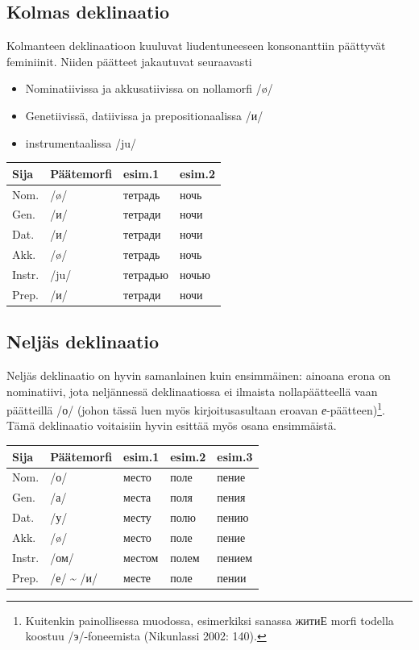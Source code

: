\documentclass[]{scrreprt}
\providecommand{\tightlist}{%
  \setlength{\itemsep}{0pt}\setlength{\parskip}{0pt}}
\begin{document}
\subsection{Kolmas deklinaatio}\label{kolmas-deklinaatio}

Kolmanteen deklinaatioon kuuluvat liudentuneeseen konsonanttiin
päättyvät feminiinit. Niiden päätteet jakautuvat seuraavasti

\begin{itemize}
\tightlist
\item
  Nominatiivissa ja akkusatiivissa on nollamorfi /ø/
\item
  Genetiivissä, datiivissa ja prepositionaalissa /и/
\item
  instrumentaalissa /ju/
\end{itemize}

\begin{longtable}[c]{@{}llll@{}}
\toprule
Sija & Päätemorfi & esim.1 & esim.2\tabularnewline
\midrule
\endhead
Nom. & /ø/ & тетрадь & ночь\tabularnewline
Gen. & /и/ & тетради & ночи\tabularnewline
Dat. & /и/ & тетради & ночи\tabularnewline
Akk. & /ø/ & тетрадь & ночь\tabularnewline
Instr. & /ju/ & тетрадью & ночью\tabularnewline
Prep. & /и/ & тетради & ночи\tabularnewline
\bottomrule
\end{longtable}

\subsection{Neljäs deklinaatio}\label{neljuxe4s-deklinaatio}

Neljäs deklinaatio on hyvin samanlainen kuin ensimmäinen: ainoana erona
on nominatiivi, jota neljännessä deklinaatiossa ei ilmaista
nollapäätteellä vaan päätteillä /о/ (johon tässä luen myös
kirjoitusasultaan eroavan \emph{е}-päätteen)\footnote{Kuitenkin
  painollisessa muodossa, esimerkiksi sanassa житиЕ morfi todella
  koostuu /э/-foneemista (Nikunlassi 2002: 140).}. Tämä deklinaatio
voitaisiin hyvin esittää myös osana ensimmäistä.

\begin{longtable}[c]{@{}lllll@{}}
\toprule
Sija & Päätemorfi & esim.1 & esim.2 & esim.3\tabularnewline
\midrule
\endhead
Nom. & /о/ & место & поле & пение\tabularnewline
Gen. & /а/ & места & поля & пения\tabularnewline
Dat. & /у/ & месту & полю & пению\tabularnewline
Akk. & /ø/ & место & поле & пение\tabularnewline
Instr. & /ом/ & местом & полем & пением\tabularnewline
Prep. & /е/ \textasciitilde{} /и/ & месте & поле & пении\tabularnewline
\bottomrule
\end{longtable}
\end{document}
